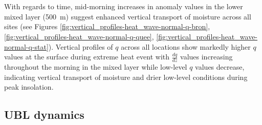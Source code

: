 \documentclass[11pt,a4paper]{article}
\begin{document}
\\ \\
With regards to time, mid-morning increases in anomaly values in the lower mixed layer (\texttildelow \SI{500}{\meter}) suggest enhanced vertical transport of moisture across all sites (see Figures \ref{fig:vertical_profiles-heat_wave-normal-q-bron}, \ref{fig:vertical_profiles-heat_wave-normal-q-quee}, \ref{fig:vertical_profiles-heat_wave-normal-q-stat}). Vertical profiles of $q$ across all locations show markedly higher $q$ values at the surface during extreme heat event with $\frac{dq}{dz}$ values increasing throughout the morning in the mixed layer while low-level $q$ values decrease, indicating vertical transport of moisture and drier low-level conditions during peak insolation.

\subsection{UBL dynamics}
\end{document}
